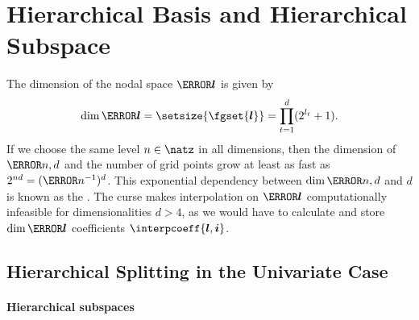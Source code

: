 \section{Hierarchical Basis and Hierarchical Subspace}
\label{sec:22hierSubspaces}


\noindent
The dimension of the nodal space $\ns{\*l}$ is given by
\begin{equation}
  \label{eq:dimensionFG}
  \dim \ns{\*l}
  = \setsize{\fgset{\*l}}
  = \prod_{t=1}^d (2^{l_t} + 1).
\end{equation}
If we choose the same level $n \in \natz$ in all dimensions,
then the dimension of $\ns{n,d}$ and the
number of grid points grow at least as fast as
$2^{nd} = (\ms{n}^{-1})^d$.
This exponential dependency between $\dim \ns{n,d}$ and $d$ is known as the
.
The curse makes interpolation on $\ns{\*l}$ computationally infeasible
for dimensionalities $d > 4$,
as we would have to calculate and store $\dim \ns{\*l}$ coefficients $\interpcoeff{\*l,\*i}$.%



\subsection{Hierarchical Splitting in the Univariate Case}
\label{sec:221hierUV}

\paragraph{Hierarchical subspaces}

